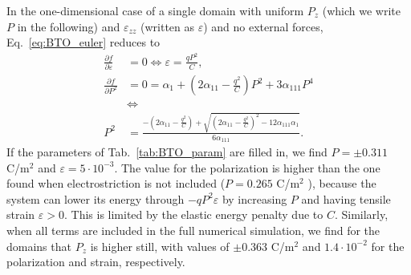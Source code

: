 In the one-dimensional case of a single domain with uniform $P_z$ (which we write $P$ in the following) and $\varepsilon_{zz}$ (written as $\varepsilon$) and no external forces, Eq.~\ref{eq:BTO_euler} reduces to  
\begin{align}
	\frac{\partial f}{\partial \varepsilon} &= 0 \Leftrightarrow \varepsilon = \frac{qP^2}{C}\label{eq:BTO_e0},\\
	\frac{\partial f}{\partial P^2} &= 0 = \alpha_1 + (2 \alpha_{11} - \frac{q^2}{C})P^2 + 3\alpha_{111}P^4 \\
	& \Leftrightarrow \\
	P^2 &= \frac{-(2\alpha_{11} - \frac{q^2}{C}) + \sqrt{(2\alpha_{11}-\frac{q^2}{C})^2 - 12 \alpha_{111} \alpha_1}}{6\alpha_{111}}.
\end{align}
If the parameters of Tab.~\ref{tab:BTO_param} are filled in, we find $P = \pm 0.311$ C/m$^2$ and $\varepsilon = 5 \cdot 10^{-3}$.
The value for the polarization is higher than the one found when electrostriction is not included ($P = 0.265$ C/m$^2$ \cite{Marton2010}), because the system can lower its energy through $-qP^2\varepsilon$ by increasing $P$ and having tensile strain $\varepsilon > 0$. This is limited by the elastic energy penalty due to $C$.
Similarly, when all terms are included in the full numerical simulation, we find for the domains that $P_z$ is higher still, with values of $\pm 0.363$ C/m$^2$ and $1.4 \cdot 10^{-2}$ for the polarization and strain, respectively.

